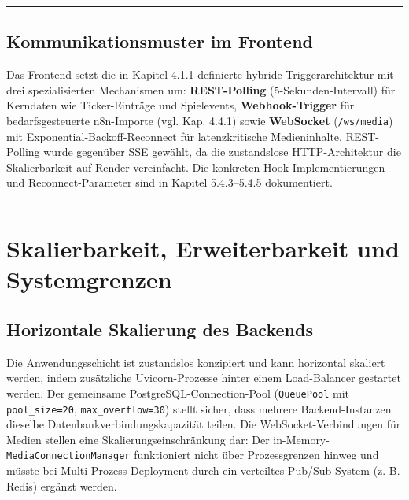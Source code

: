 \begin{center}\rule{0.5\linewidth}{0.5pt}\end{center}

\subsection{Kommunikationsmuster im
Frontend}\label{kommunikationsmuster-im-frontend}

Das Frontend setzt die in Kapitel 4.1.1 definierte hybride
Triggerarchitektur mit drei spezialisierten Mechanismen um:
\textbf{REST-Polling} (5-Sekunden-Intervall) für Kerndaten wie
Ticker-Einträge und Spielevents, \textbf{Webhook-Trigger} für
bedarfsgesteuerte n8n-Importe (vgl. Kap. 4.4.1) sowie \textbf{WebSocket}
(\texttt{/ws/media}) mit Exponential-Backoff-Reconnect für
latenzkritische Medieninhalte. REST-Polling wurde gegenüber SSE gewählt,
da die zustandslose HTTP-Architektur die Skalierbarkeit auf Render
vereinfacht. Die konkreten Hook-Implementierungen und
Reconnect-Parameter sind in Kapitel 5.4.3--5.4.5 dokumentiert.

\begin{center}\rule{0.5\linewidth}{0.5pt}\end{center}

\section{Skalierbarkeit, Erweiterbarkeit und
Systemgrenzen}\label{skalierbarkeit-erweiterbarkeit-und-systemgrenzen}

\subsection{Horizontale Skalierung des
Backends}\label{horizontale-skalierung-des-backends}

Die Anwendungsschicht ist zustandslos konzipiert und kann horizontal
skaliert werden, indem zusätzliche Uvicorn-Prozesse hinter einem
Load-Balancer gestartet werden. Der gemeinsame
PostgreSQL-Connection-Pool (\texttt{QueuePool} mit
\texttt{pool\_size=20}, \texttt{max\_overflow=30}) stellt sicher, dass
mehrere Backend-Instanzen dieselbe Datenbankverbindungskapazität teilen.
Die WebSocket-Verbindungen für Medien stellen eine
Skalierungseinschränkung dar: Der
in-Memory-\texttt{MediaConnectionManager} funktioniert nicht über
Prozessgrenzen hinweg und müsste bei Multi-Prozess-Deployment durch ein
verteiltes Pub/Sub-System (z. B. Redis) ergänzt werden.

